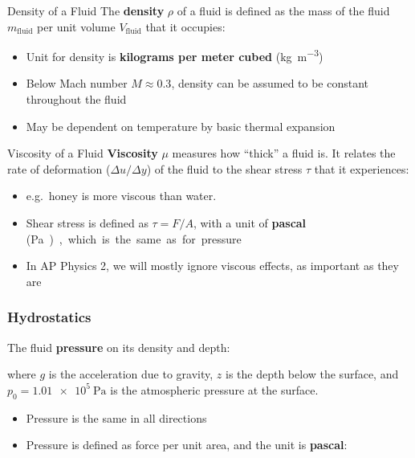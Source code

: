 \documentclass[12pt,aspectratio=169]{beamer}
\begin{document}
\begin{frame}{Density of a Fluid}
  The \textbf{density} $\rho$ of a fluid is defined as the mass of the fluid
  $m_\text{fluid}$ per unit volume $V_\text{fluid}$ that it occupies:
  
  \begin{itemize}
  \item Unit for density is \textbf{kilograms per meter cubed}
    (\si{\kilo\gram\per\metre\cubed})
  \item Below Mach number $M\approx 0.3$, density can be assumed to be constant
    throughout the fluid
  \item May be dependent on temperature by basic thermal expansion
  \end{itemize}
\end{frame}



\begin{frame}{Viscosity of a Fluid}
  \textbf{Viscosity} $\mu$ measures how ``thick'' a fluid is. It relates the
  rate of deformation ($\Delta u/\Delta y$) of the fluid to the shear stress
  $\tau$ that it experiences:

  \begin{itemize}
  \item e.g.\ honey is more viscous than water.
  \item Shear stress is defined as $\tau=F/A$, with a unit of \textbf{pascal}
    (\si\pascal), which is the same as for pressure
  \item In AP Physics 2, we will mostly ignore viscous effects, as important as
    they are
  \end{itemize}
\end{frame}



\begin{frame}
  \frametitle{Hydrostatics}
  The fluid \textbf{pressure} on its density and depth:

  
  where $g$ is the acceleration due to gravity, $z$ is the depth below the
  surface, and $p_0=\SI{1.01e5}\pascal$ is the atmospheric pressure at the
  surface.
  \begin{itemize}
  \item Pressure is the same in all directions
  \item Pressure is defined as force per unit area, and the unit is
    \textbf{pascal}:

  \end{itemize}
\end{frame}
\end{document}
